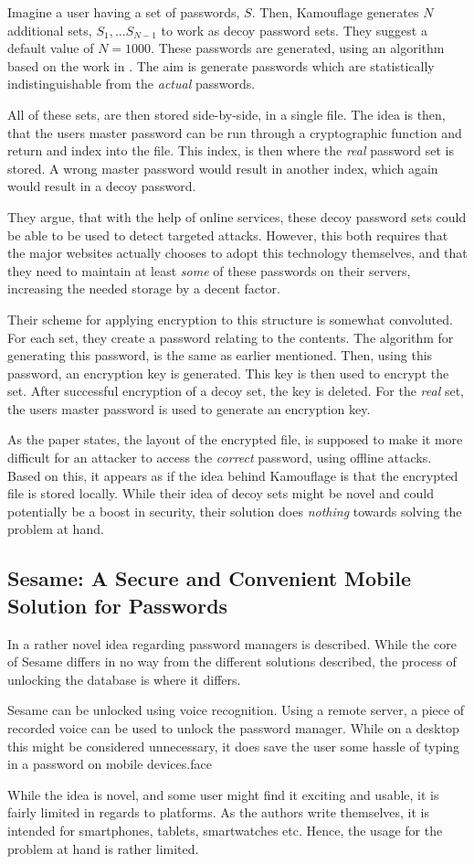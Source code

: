 			Imagine a user having a set of passwords, $S$. Then, Kamouflage generates $N$ additional sets, $S_1, \dots S_{N-1}$ to work as decoy password sets. They suggest a default value of $N=1000$. These passwords are generated, using an algorithm based on the work in \cite{cracking}. The aim is generate passwords which are statistically indistinguishable from the \emph{actual} passwords. 

			All of these sets, are then stored side-by-side, in a single file. The idea is then, that the users master password can be run through a cryptographic function and return and index into the file. This index, is then where the \emph{real} password set is stored. A wrong master password would result in another index, which again would result in a decoy password.

			They argue, that with the help of online services, these decoy password sets could be able to be used to detect targeted attacks. However, this both requires that the major websites actually chooses to adopt this technology themselves, and that they need to maintain at least \emph{some} of these passwords on their servers, increasing the needed storage by a decent factor.

			Their scheme for applying encryption to this structure is somewhat convoluted. For each set, they create a password relating to the contents. The algorithm for generating this password, is the same as earlier mentioned. Then, using this password, an encryption key is generated. This key is then used to encrypt the set. After successful encryption of a decoy set, the key is deleted. For the \emph{real} set, the users master password is used to generate an encryption key.

			As the paper states, the layout of the encrypted file, is supposed to make it more difficult for an attacker to access the \emph{correct} password, using offline attacks. Based on this, it appears as if the idea behind Kamouflage is that the encrypted file is stored locally. While their idea of decoy sets might be novel and could potentially be a boost in security, their solution does \emph{nothing} towards solving the problem at hand.


		\subsection*{Sesame: A Secure and Convenient Mobile Solution for Passwords}
			In \cite{sesame} a rather novel idea regarding password managers is described. While the core of Sesame differs in no way from the different solutions described, the process of unlocking the database is where it differs.

			Sesame can be unlocked using voice recognition. Using a remote server, a piece of recorded voice can be used to unlock the password manager. While on a desktop this might be considered unnecessary, it does save the user some hassle of typing in a password on mobile devices.face

			While the idea is novel, and some user might find it exciting and usable, it is fairly limited in regards to platforms. As the authors write themselves, it is intended for smartphones, tablets, smartwatches etc. Hence, the usage for the problem at hand is rather limited.
